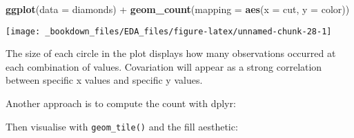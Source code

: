 \documentclass[]{book}
\newenvironment{Shaded}{\begin{snugshade}}{\end{snugshade}}
\newcommand{\KeywordTok}[1]{\textcolor[rgb]{0.13,0.29,0.53}{\textbf{{#1}}}}
\newcommand{\DataTypeTok}[1]{\textcolor[rgb]{0.13,0.29,0.53}{{#1}}}
\newcommand{\StringTok}[1]{\textcolor[rgb]{0.31,0.60,0.02}{{#1}}}
\newcommand{\CommentTok}[1]{\textcolor[rgb]{0.56,0.35,0.01}{\textit{{#1}}}}
\newcommand{\NormalTok}[1]{{#1}}
\begin{document}
\begin{Shaded}
\begin{Highlighting}[]
\KeywordTok{ggplot}\NormalTok{(}\DataTypeTok{data =} \NormalTok{diamonds) +}
\StringTok{  }\KeywordTok{geom_count}\NormalTok{(}\DataTypeTok{mapping =} \KeywordTok{aes}\NormalTok{(}\DataTypeTok{x =} \NormalTok{cut, }\DataTypeTok{y =} \NormalTok{color))}
\end{Highlighting}
\end{Shaded}

\begin{center}\texttt{[image: \_bookdown\_files/EDA\_files/figure-latex/unnamed-chunk-28-1]} \end{center}

The size of each circle in the plot displays how many observations
occurred at each combination of values. Covariation will appear as a
strong correlation between specific x values and specific y values.

Another approach is to compute the count with dplyr:

\begin{Shaded}
\end{Shaded}

Then visualise with \texttt{geom\_tile()} and the fill aesthetic:

\begin{Shaded}
\end{Shaded}
\end{document}
